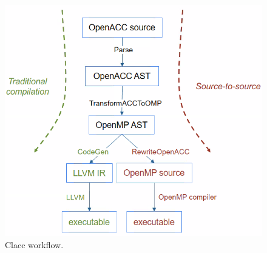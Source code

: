 
\begin{figure}
\centering
\includegraphics[scale=0.3]{projects/2.3.2-Tools/2.3.2.10-PROTEAS-YTUNE/clacc.png}
\caption{Clacc workflow.}
\label{fig:clacc-workflow}
\end{figure}


\vspace{-1em}

